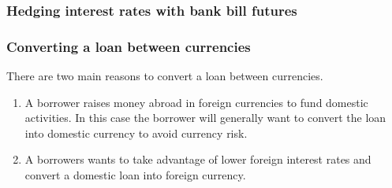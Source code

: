 \documentclass{tran-l}
\theoremstyle{definition}
\theoremstyle{remark}
\numberwithin{equation}{subsection}
\begin{document}
 

 




\subsubsection{Hedging interest rates with bank bill futures}




\subsubsection{Converting a loan between currencies}


There are two main reasons to convert a loan between currencies.

\begin{enumerate}
\item A borrower raises money abroad in foreign currencies to fund domestic activities. In this case the borrower will generally want to convert the loan into domestic currency to avoid currency risk. 
\item A borrowers wants to take advantage of lower foreign interest rates and convert a domestic loan into foreign currency. 
\end{enumerate}
\end{document}
